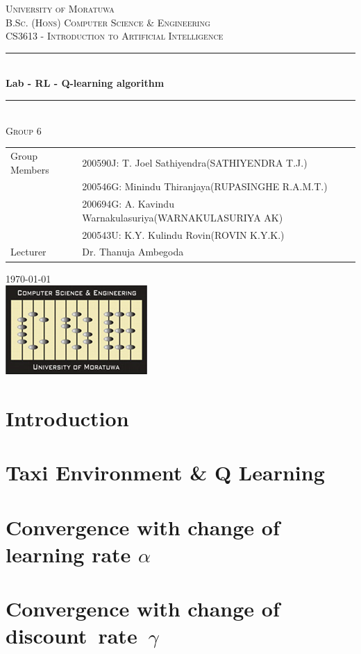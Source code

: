 \documentclass[11pt]{article}
\begin{document}
\begin{titlepage}

\newcommand{\HRule}{\rule{\linewidth}{0.5mm}} 

\center 

\textsc{\LARGE University of Moratuwa}\\[1.5cm] 

\textsc{\Large  B.Sc. (Hons) Computer Science \& Engineering}\\[0.5cm] 
\textsc{\large CS3613 - Introduction to Artificial Intelligence}\\[0.5cm] 

\HRule \\[0.4cm]
{ \huge \bfseries Lab - RL - Q-learning algorithm}\\[0.4cm] 

\HRule \\[1.5cm]

\textsc{\LARGE Group 6}\\[1.5cm] %
\noindent\begin{tabular}{@{}ll}
    Group Members & 200590J: T. Joel Sathiyendra(SATHIYENDRA T.J.)\\
    & 200546G: Minindu Thiranjaya(RUPASINGHE R.A.M.T.)  \\
    & 200694G: A. Kavindu Warnakulasuriya(WARNAKULASURIYA AK) \\
    & 200543U: K.Y. Kulindu Rovin(ROVIN K.Y.K.)  \\[.5cm]
     Lecturer &  Dr. Thanuja Ambegoda\\[.5cm]
\end{tabular}

{\large \today}\\[2cm] 

\includegraphics{CSE_logo.png}\\[1cm] 

\vfill %

\end{titlepage}

\section*{Introduction}
\section*{Taxi Environment \& Q Learning}
\section*{Convergence with change of learning rate $\alpha $}
\section*{Convergence with change of discount rate $\gamma $}
\end{document}
